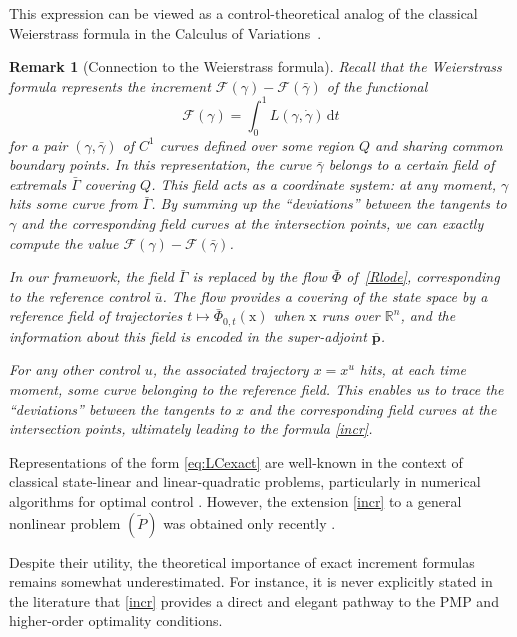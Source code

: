 \documentclass[sn-mathphys-num]{sn-jnl}
\numberwithin{equation}{section}
\theoremstyle{mythm}
\theoremstyle{mydef}
\newtheorem{remark}[proposition]{Remark}
\renewcommand{\mathbf}[1]{\bm{#1}}
\begin{document}
This expression can be viewed as a control-theoretical analog of the classical Weierstrass formula in the Calculus of Variations~\cite{lavrentiev1938}. 

\begin{remark}[Connection to the Weierstrass formula]

Recall that the Weierstrass formula represents the increment \( \mathcal{F}(\gamma) - \mathcal{F}(\bar \gamma) \) of the functional 
\[
\mathcal{F}(\gamma) = \int_0^1 L(\gamma, \dot{\gamma}) \, \mathrm{d} t
\]
for a pair  \( (\gamma, \bar{\gamma}) \) of $C^1$ curves defined over some region \( Q \) and sharing common boundary points. In this representation, the curve \( \bar{\gamma} \) belongs to a certain \emph{field of extremals} $\bar \Gamma$ covering \( Q \). This field acts as a coordinate system: at any moment, $\gamma$ hits some curve from $\bar \Gamma$. By summing up the ``deviations'' between the tangents to \( \gamma \) and the corresponding field curves at the intersection points, we can exactly compute the value \( \mathcal{F}(\gamma) - \mathcal{F}(\bar{\gamma}) \).

In our framework, the field $\bar \Gamma$ is replaced by the flow \( \bar{\Phi} \) of~\eqref{Rlode}, corresponding to the \emph{reference} control \( \bar{u} \). The flow provides a covering of the state space by a \emph{reference field} of trajectories \( t \mapsto \bar{\Phi}_{0,t}(\mathrm{x}) \) when $\mathrm{x}$ runs over \(\mathbb{R}^n \), and the information about this field is encoded in the super-adjoint \( \bar{\mathbf{p}} \). 

For any other control \( u \), the associated trajectory \( x = x^u \) hits, at each time moment, some curve belonging to the reference field. This enables us to trace the ``deviations'' between the tangents to \( x \) and the corresponding field curves at the intersection points, ultimately leading to the formula \eqref{incr}.
\end{remark}


Representations of the form \eqref{eq:LCexact} are well-known in the context of classical state-linear and linear-quadratic problems, particularly in numerical algorithms for optimal control \cite{GK-SIAM1972, srochko1982computational}. However, the extension \eqref{incr} to a general nonlinear problem $(\widetilde{P})$ was obtained only recently \cite{pogodaevExactFormulaeIncrement2024}.  

Despite their utility, the theoretical importance of exact increment formulas remains somewhat underestimated. For instance, it is never explicitly stated in the literature that \eqref{incr} provides a direct and elegant pathway to the PMP and higher-order optimality conditions.
\end{document}
